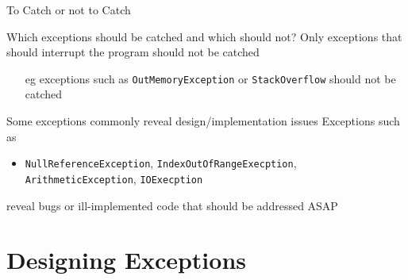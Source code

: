 \documentclass[presentation]{beamer}
\begin{document}
\begin{frame}{To Catch or not to Catch}

  \begin{block}{Which exceptions should be catched and which should not?}
    \centering
    Only exceptions that \alert{should} interrupt the program \alert{should not} be catched
    \begin{itemize}
      \item[eg] exceptions such as \texttt{OutMemoryException} or \texttt{StackOverflow} should not be catched
    \end{itemize}
  \end{block}

  \begin{block}{Some exceptions commonly reveal design/implementation issues}
    Exceptions such as 
    \begin{itemize}
      \item \texttt{NullReferenceException}, \texttt{IndexOutOfRangeExecption}, \texttt{ArithmeticException}, \texttt{IOExecption}
    \end{itemize}
    reveal bugs or ill-implemented code that should be addressed ASAP
  \end{block}
\end{frame}

\section{Designing Exceptions}
\end{document}
